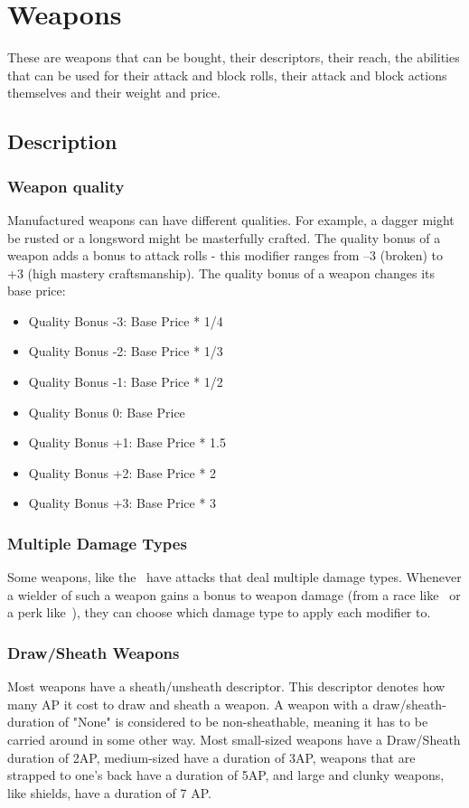 \chapter{Weapons}\label{ch:weapons}
These are weapons that can be bought, their descriptors, their reach, the abilities that can be used for their attack and block rolls, their attack and block actions themselves and their weight and price.\\
\section{Description}\label{sec:weaponDescription}
\subsection{Weapon quality}\label{subsec:weaponQuality}
Manufactured weapons can have different qualities.
For example, a dagger might be rusted or a longsword might be masterfully crafted.
The quality bonus of a weapon adds a bonus to attack rolls - this modifier ranges from --3 (broken) to +3 (high mastery craftsmanship).
The quality bonus of a weapon changes its base price:\\

\begin{itemize}
    \item Quality Bonus -3: Base Price * 1/4
    \item Quality Bonus -2: Base Price * 1/3
    \item Quality Bonus -1: Base Price * 1/2
    \item Quality Bonus 0: Base Price
    \item Quality Bonus +1: Base Price * 1.5
    \item Quality Bonus +2: Base Price * 2
    \item Quality Bonus +3: Base Price * 3
\end{itemize}

\subsection{Multiple Damage Types}\label{subsec:multipleDamageTypeWeapons}
Some weapons, like the~ have attacks that deal multiple damage types.
Whenever a wielder of such a weapon gains a bonus to weapon damage (from a race like~ or a perk like~), they can choose which damage type to apply each modifier to.

\subsection{Draw/Sheath Weapons}\label{subsec:sheathWeapons}
Most weapons have a sheath/unsheath descriptor.
This descriptor denotes how many AP it cost to draw and sheath a weapon.
A weapon with a draw/sheath-duration of "None" is considered to be non-sheathable, meaning it has to be carried around in some other way.
Most small-sized weapons have a Draw/Sheath duration of 2AP, medium-sized have a duration of 3AP, weapons that are strapped to one's back have a duration of 5AP, and large and clunky weapons, like shields, have a duration of 7 AP.

